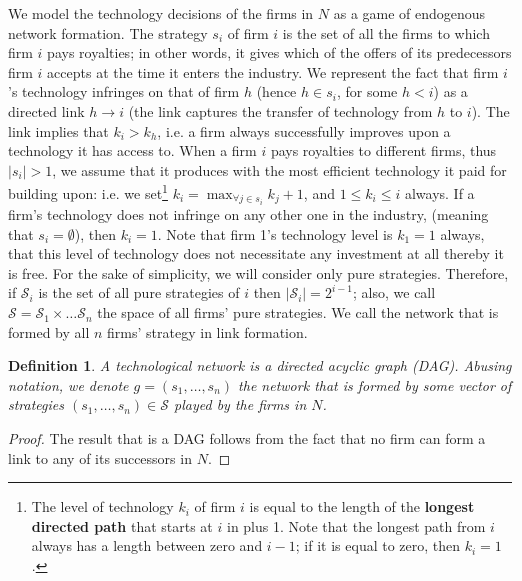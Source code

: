 \documentclass{article}
\newtheorem{definition}{Definition}
\begin{document}
\indent We model the technology decisions of the firms in $N$ as a game of endogenous network formation. The strategy $s_i$ of firm $i$ is the set of all the firms to which firm $i$ pays royalties; in other words, it gives which of the offers of its predecessors firm $i$ accepts at the time it enters the industry. We represent the fact that firm $i$'s technology infringes on that of firm $h$ (hence $h\in s_i$, for some $h<i$) as a directed link $h\rightarrow i$ (the link captures the transfer of technology from $h$ to $i$). The link implies that $k_i>k_h$, i.e. a firm always successfully improves upon a technology it has access to. When a firm $i$ pays royalties to different firms, thus $|s_i|>1$, we assume that it produces with the most efficient technology it paid for building upon: i.e. we set\footnote{The level of technology $k_i$ of firm $i$ is equal to the length of the \textbf{longest directed path} that starts at $i$ in  plus 1. Note that the longest path from $i$ always has a length between zero and $i-1$; if it is equal to zero, then $k_i=1$.} $k_i=\max_{\forall j\in s_i} k_j+1$, and $1\leq k_i\leq i$ always. If a firm's technology does not infringe on any other one in the industry, (meaning that $s_i=\emptyset$), then $k_i=1$. Note that firm 1's technology level is $k_1=1$ always, that this level of technology does not necessitate any investment at all thereby it is free. For the sake of simplicity, we will consider only pure strategies. Therefore, if $\mathcal{S}_i$ is the set of all pure strategies of $i$ then $|\mathcal{S}_i|=2^{i-1}$; also, we call $\mathcal{S}=\mathcal{S}_1\times\ldots \mathcal{S}_n$ the space of all firms' pure strategies. We call  the network that is formed by all $n$ firms' strategy in link formation.  \\

\begin{definition}
A technological network  is a directed acyclic graph (DAG). Abusing notation, we denote $g=(s_1,\dots, s_n)$ the network that is formed by some vector of strategies $(s_1,\ldots, s_n)\in \mathcal{S}$ played by the firms in $N$. 
\end{definition}
\begin{proof}
The result that  is a DAG follows from the fact that no firm can form a link to any of its successors in $N$. 
\end{proof}
\end{document}
